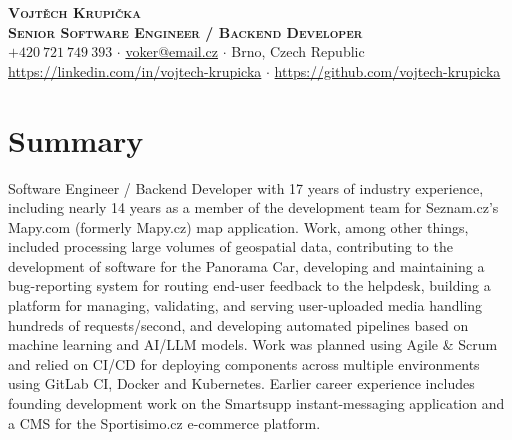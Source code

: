 \documentclass[letterpaper,11pt]{article}
\begin{document}


    \textbf{\Huge \scshape Vojtěch Krupička} \\ \vspace{6pt} 
    \textbf{\Large \scshape Senior Software Engineer / Backend Developer} \\ \vspace{4pt} 
    \small $+420\ 721\ 749\ 393$ $\cdot$ \href{mailto:voker@email.cz}{voker@email.cz} $\cdot$ Brno, Czech Republic \\
    \href{https://linkedin.com/in/vojtech-krupicka}{https://linkedin.com/in/vojtech-krupicka} $\cdot$ \href{https://github.com/vojtech-krupicka}{https://github.com/vojtech-krupicka}   


\section{Summary}
{Software Engineer / Backend Developer with 17 years of industry experience, including nearly 14 years as a member of the development team for Seznam.cz's Mapy.com (formerly Mapy.cz) map application. Work, among other things, included processing large volumes of geospatial data, contributing to the development of software for the Panorama Car, developing and maintaining a bug-reporting system for routing end-user feedback to the helpdesk, building a platform for managing, validating, and serving user-uploaded media handling hundreds of requests/second, and developing automated pipelines based on machine learning and AI/LLM models. Work was planned using Agile \& Scrum and relied on CI/CD for deploying components across multiple environments using GitLab CI, Docker and Kubernetes. Earlier career experience includes founding development work on the Smartsupp instant-messaging application and a CMS for the Sportisimo.cz e-commerce platform.}
\end{document}
